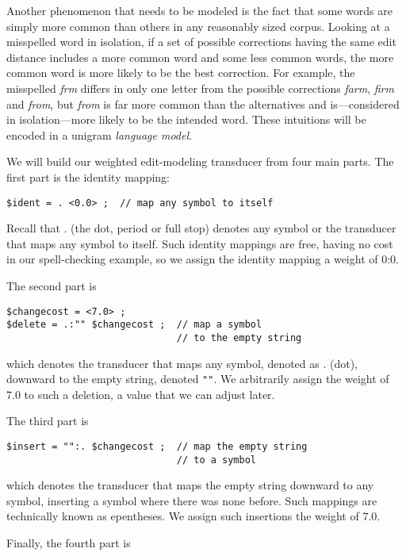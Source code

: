 Another phenomenon that needs to be modeled is the fact that some words are
simply more common than others in any reasonably sized corpus.  Looking at a misspelled word
in isolation,
if a set of possible corrections having the same edit distance includes a more common word and
	some less
common words, the more common word is more likely to be the best correction.  For
example, the misspelled \emph{frm} differs in only one letter from the possible
corrections \emph{farm}, \emph{firm} and \emph{from}, but \emph{from} is far more common than
the alternatives and is---considered in isolation---more likely to be the intended
word.  These intuitions will be encoded in a unigram \emph{language model}.

We will build our weighted edit-modeling transducer from four main parts.  The first
part is the identity mapping:

\begin{Verbatim}
$ident = . <0.0> ;	// map any symbol to itself
\end{Verbatim}

\noindent
Recall that . (the dot, period or full stop) denotes any symbol or the transducer that maps any
symbol to itself.  Such identity mappings are free, having no cost in
our spell-checking example, so we assign the identity mapping a weight of 0:0.

The second part is

\begin{Verbatim}
$changecost = <7.0> ;
$delete = .:"" $changecost ;  // map a symbol 
                              // to the empty string
\end{Verbatim}

\noindent which denotes the transducer that maps any symbol, denoted as . (dot),
downward to the empty string, denoted \texttt{""}.  We arbitrarily assign the
weight of 7.0 to such a deletion, a value that we can adjust later.

The third part is

\begin{Verbatim}
$insert = "":. $changecost ;  // map the empty string 
                              // to a symbol
\end{Verbatim}

\noindent which denotes the transducer that maps the empty string downward to any
symbol, inserting a symbol where there was none before.  Such mappings are technically known as
epentheses.  We assign such
insertions the weight of 7.0.

Finally, the fourth part is

